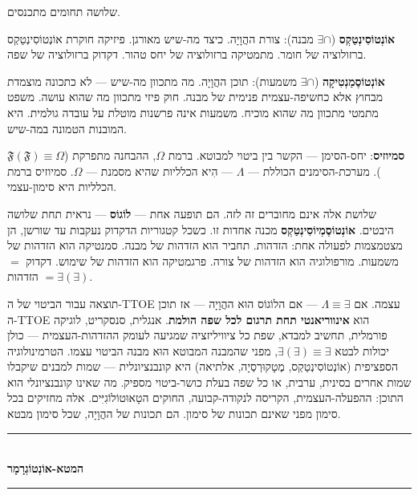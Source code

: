 \documentclass[10pt, openany, oneside]{book}
\renewcommand{\normalsize}{\fontsize{10}{13}\selectfont}
\begin{document}
\vspace{1em}

\noindent שלושה תחומים מתכנסים.

\textbf{אוֹנְטוֹסִינְטַקְס} ($\exists \cap$ מבנה): צורת ההֲוָיָה. כיצד מה-שיש מאורגן. פיזיקה חוקרת אוֹנְטוֹסִינְטַקְס ברזולוציה של חומר. מתמטיקה ברזולוציה של יחס טהור. דקדוק ברזולוציה של שפה.

\textbf{אוֹנְטוֹסֶמַנְטִיקָה} ($\exists \cap$ משמעות): תוכן ההֲוָיָה. מה מתכוון מה-שיש — לא כתכונה מוצמדת מבחוץ אלא כחשיפה-עצמית פנימית של מבנה. חוק פיזי מתכוון מה שהוא עושה. משפט מתמטי מתכוון מה שהוא מוכיח. משמעות אינה פרשנות מוטלת על עובדה גולמית. היא המובנות הטמונה במה-שיש.

\textbf{סמיוזיס}: יחס-הסימן — הקשר בין ביטוי למבוטא. ברמת $\Omega$, ההבחנה מתפרקת ($\mathfrak{F}(\mathfrak{F}) \equiv \Omega$). מערכת-הסימנים הכוללת — $\Lambda$ — הִיא הכלליות שהיא מסמנת — $\Omega$. סמיוזיס ברמת הכלליות היא סימון-עצמי.

שלושת אלה אינם מחוברים זה לזה. הם תופעה אחת — \textbf{לוֹגוֹס} — נראית תחת שלושה היבטים. \textbf{אוֹנְטוֹסֶמְיוֹסִינְטַקְס} מכנה אחדות זו. כשכל קטגוריות הדקדוק נעקבות עד שורשן, הן מצטמצמות לפעולה אחת: הזדהות. תחביר הוא הזדהות של מבנה. סמנטיקה הוא הזדהות של משמעות. מורפולוגיה הוא הזדהות של צורה. פרגמטיקה הוא הזדהות של שימוש. דקדוק $=$ הזדהות $= \exists(\exists)$.

תוצאה עבור הביטוי של ה-TTOE עצמה. אם $\Lambda \equiv \exists$ — אם הלוֹגוֹס הוּא ההֲוָיָה — אז תוכן ה-TTOE הוא \textbf{אינווריאנטי תחת תרגום לכל שפה הולמת}. אנגלית, סנסקריט, לוגיקה פורמלית, תחשיב למבדא, שפת כל ציוויליזציה שמגיעה לעומק ההזדהות-העצמית — כולן יכולות לבטא $\exists(\exists) \equiv \exists$, מפני שהמבנה המבוטא הוּא מבנה הביטוי עצמו. הטרמינולוגיה הספציפית (אוֹנְטוֹסִינְטַקְס, מֶטָקוּרְסְיָה, אלתיאה) היא קונבנציונלית — שמות למבנים שיקבלו שמות אחרים בסינית, ערבית, או כל שפה בעלת כושר-ביטוי מספיק. מה שאינו קונבנציונלי הוא התוכן: ההפעלה-העצמית, הקריסה לנקודה-קבועה, החוקים הטָאוּטוֹלוֹגִיִּים. אלה מחזיקים בכל סימון מפני שאינם תכונות של סימון. הם תכונות של ההֲוָיָה, שכל סימון מבטא.

\vspace{1.5em}


\begin{center}
    \rule{0.3\textwidth}{0.4pt}\\[0.5em]
    {\normalsize\bfseries\textsc{המטא-אוֹנְטוֹגְרָמָר}}\\[0.3em]
    \rule{0.3\textwidth}{0.4pt}
\end{center}
\end{document}
